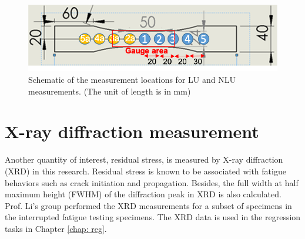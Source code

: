\begin{figure}[tb]
  \includegraphics[width=\linewidth]{fig/specimen_measurment_locs.png}
  \caption{Schematic of the measurement locations for LU and NLU measurements. (The unit of length is in mm)}
  \label{fig: measurement locations}
\end{figure}

\section{X-ray diffraction measurement}
Another quantity of interest, residual stress, is measured by X-ray diffraction (XRD) in this research. Residual stress is known to be associated with fatigue behaviors such as crack initiation and propagation. Besides, the full width at half maximum height (FWHM) of the diffraction peak in XRD is also calculated. Prof. Li's group performed the XRD measurements for a subset of specimens in the interrupted fatigue testing specimens. The XRD data is used in the regression tasks in Chapter \ref{chap: reg}.
